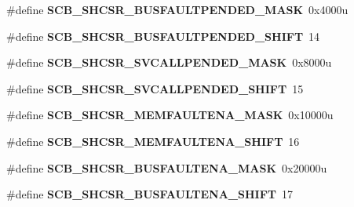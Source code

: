 \begin{DoxyCompactItemize}
\item 
\hypertarget{group___s_c_b___register___masks_ga196485bcd4473212a57a4449f0738ae5}{}\#define {\bfseries S\+C\+B\+\_\+\+S\+H\+C\+S\+R\+\_\+\+B\+U\+S\+F\+A\+U\+L\+T\+P\+E\+N\+D\+E\+D\+\_\+\+M\+A\+S\+K}~0x4000u\label{group___s_c_b___register___masks_ga196485bcd4473212a57a4449f0738ae5}

\item 
\hypertarget{group___s_c_b___register___masks_ga5578c153c1fbc6c326af0ff1e197ef3a}{}\#define {\bfseries S\+C\+B\+\_\+\+S\+H\+C\+S\+R\+\_\+\+B\+U\+S\+F\+A\+U\+L\+T\+P\+E\+N\+D\+E\+D\+\_\+\+S\+H\+I\+F\+T}~14\label{group___s_c_b___register___masks_ga5578c153c1fbc6c326af0ff1e197ef3a}

\item 
\hypertarget{group___s_c_b___register___masks_gaa3091912694f50ac51a925d4d7bcf854}{}\#define {\bfseries S\+C\+B\+\_\+\+S\+H\+C\+S\+R\+\_\+\+S\+V\+C\+A\+L\+L\+P\+E\+N\+D\+E\+D\+\_\+\+M\+A\+S\+K}~0x8000u\label{group___s_c_b___register___masks_gaa3091912694f50ac51a925d4d7bcf854}

\item 
\hypertarget{group___s_c_b___register___masks_gad441fbcc06889927347ce287c2520a97}{}\#define {\bfseries S\+C\+B\+\_\+\+S\+H\+C\+S\+R\+\_\+\+S\+V\+C\+A\+L\+L\+P\+E\+N\+D\+E\+D\+\_\+\+S\+H\+I\+F\+T}~15\label{group___s_c_b___register___masks_gad441fbcc06889927347ce287c2520a97}

\item 
\hypertarget{group___s_c_b___register___masks_gabd204d391ff2a884a4a98b759d3a4d79}{}\#define {\bfseries S\+C\+B\+\_\+\+S\+H\+C\+S\+R\+\_\+\+M\+E\+M\+F\+A\+U\+L\+T\+E\+N\+A\+\_\+\+M\+A\+S\+K}~0x10000u\label{group___s_c_b___register___masks_gabd204d391ff2a884a4a98b759d3a4d79}

\item 
\hypertarget{group___s_c_b___register___masks_gac72b28d7ffb8566d9afcdde86fa329af}{}\#define {\bfseries S\+C\+B\+\_\+\+S\+H\+C\+S\+R\+\_\+\+M\+E\+M\+F\+A\+U\+L\+T\+E\+N\+A\+\_\+\+S\+H\+I\+F\+T}~16\label{group___s_c_b___register___masks_gac72b28d7ffb8566d9afcdde86fa329af}

\item 
\hypertarget{group___s_c_b___register___masks_ga33408fd31c038df404a409879a55e4df}{}\#define {\bfseries S\+C\+B\+\_\+\+S\+H\+C\+S\+R\+\_\+\+B\+U\+S\+F\+A\+U\+L\+T\+E\+N\+A\+\_\+\+M\+A\+S\+K}~0x20000u\label{group___s_c_b___register___masks_ga33408fd31c038df404a409879a55e4df}

\item 
\hypertarget{group___s_c_b___register___masks_ga93f607a2521a9a8e0ede8a9d8b013b35}{}\#define {\bfseries S\+C\+B\+\_\+\+S\+H\+C\+S\+R\+\_\+\+B\+U\+S\+F\+A\+U\+L\+T\+E\+N\+A\+\_\+\+S\+H\+I\+F\+T}~17\label{group___s_c_b___register___masks_ga93f607a2521a9a8e0ede8a9d8b013b35}


\end{DoxyCompactItemize}
